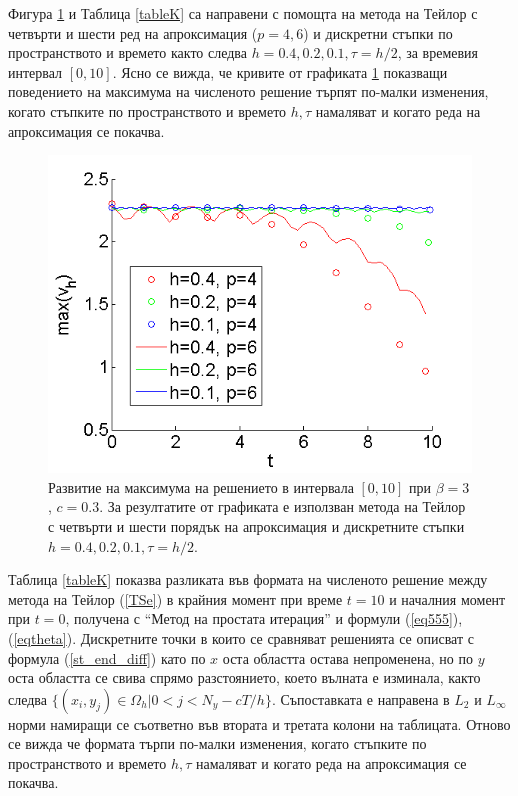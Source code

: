 \documentclass[a4paper]{article}
\newcommand{\rf}[1]{(\ref{#1})}
\theoremstyle{remark}
\begin{document}
Фигура \ref{MultiMaximum} и Таблица \ref{tableK} са направени с помощта на метода на Тейлор с четвърти и шести ред на апроксимация ($p=4,6$) и дискретни стъпки по пространството и времето както следва $h=0.4, 0.2, 0.1, \tau = h/2$, за времевия интервал $[0, 10]$. Ясно се вижда, че кривите от графиката \ref{MultiMaximum} показващи поведението на максимума на численото решение търпят по-малки изменения, когато стъпките по пространството и времето $h, \tau$ намаляват и когато реда на апроксимация се покачва.

\begin{figure}\vspace{0.2cm}
	\includegraphics[width=\linewidth]{Maximum_TaylorZeroBnd_50x50_bt3_c030.png}
\caption{Развитие на максимума на решението в интервала $[0, 10]$ при $\beta = 3$, $c=0.3$. За резултатите от графиката е използван метода на Тейлор с четвърти и шести порядък на апроксимация и дискретните стъпки $h=0.4, 0.2, 0.1, \tau = h/2$.}
\label{MultiMaximum}
\end{figure}
\FloatBarrier

Таблица \ref{tableK} показва разликата във формата на численото решение между метода на Тейлор \rf{TSe} в крайния момент при време $t=10$ и началния момент при $t=0$, получена с ``Метод на простата итерация'' и формули \rf{eq555}, \rf{eqtheta}. Дискретните точки в които се сравняват решенията се описват с формула \rf{st_end_diff} като по $x$ оста областта остава непроменена, но по $y$ оста областта се свива спрямо разстоянието, което вълната е изминала, както следва $\{(x_i, y_j) \in \Omega_h |0 < j < N_y - cT/h\}$. Съпоставката е направена в $L_2$ и $L_\infty$ норми намиращи се съответно във втората и третата колони на таблицата. Отново се вижда че формата търпи по-малки изменения, когато стъпките по пространството и времето $h, \tau$ намаляват и когато реда на апроксимация се покачва.
\end{document}
